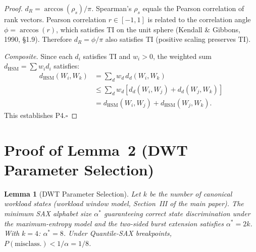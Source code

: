 \documentclass[10pt,twocolumn,a4paper]{article}
\newtheorem{lemma}{Lemma}
\newcommand{\dHSM}{d_{\mathrm{HSM}}}
\begin{document}
\begin{proof}
\emph{$d_R = \arccos(\rho_s)/\pi$.} Spearman's $\rho_s$ equals the
Pearson correlation of rank vectors. Pearson correlation $r\in[-1,1]$
is related to the correlation angle $\phi=\arccos(r)$, which satisfies
TI on the unit sphere (Kendall \& Gibbons, 1990, \S1.9). Therefore
$d_R=\phi/\pi$ also satisfies TI (positive scaling preserves TI).

\emph{Composite.} Since each $d_i$ satisfies TI and $w_i>0$, the
weighted sum $\dHSM=\sum w_i d_i$ satisfies:
\begin{align*}
  \dHSM(W_i,W_k)&=\sum_d w_d\,d_d(W_i,W_k)\\
  &\leq\sum_d w_d[d_d(W_i,W_j)+d_d(W_j,W_k)]\\
  &=\dHSM(W_i,W_j)+\dHSM(W_j,W_k).
\end{align*}
This establishes P4.\hfill$\square$
\end{proof}

\section{Proof of Lemma~2 (DWT Parameter Selection)}

\begin{lemma}[DWT Parameter Selection]
Let $k$ be the number of canonical workload states (workload window
model, Section~III of the main paper). The minimum SAX alphabet size
$\alpha^{*}$ guaranteeing correct state discrimination under the
maximum-entropy model and the two-sided burst extension satisfies
$\alpha^{*}=2k$. With $k=4$: $\alpha^{*}=8$. Under Quantile-SAX
breakpoints, $P(\mathrm{misclass.})<1/\alpha=1/8$.
\end{lemma}
\end{document}
